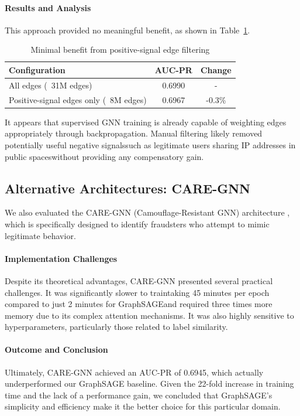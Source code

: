 \paragraph{Results and Analysis}
This approach provided no meaningful benefit, as shown in Table~\ref{tab:edge_filtering_results}.

\begin{table}[h]
\centering
\caption{Minimal benefit from positive-signal edge filtering}
\label{tab:edge_filtering_results}
\begin{tabular}{lcc}
\hline
\textbf{Configuration} & \textbf{AUC-PR} & \textbf{Change} \\
\hline
All edges (~31M edges) & 0.6990 & - \\
Positive-signal edges only (~8M edges) & 0.6967 & -0.3\% \\
\hline
\end{tabular}
\end{table}

It appears that supervised GNN training is already capable of weighting edges appropriately through backpropagation. Manual filtering likely removed potentially useful negative signalssuch as legitimate users sharing IP addresses in public spaceswithout providing any compensatory gain.

\subsection{Alternative Architectures: CARE-GNN}

We also evaluated the CARE-GNN (Camouflage-Resistant GNN) architecture \cite{dou2020enhancing}, which is specifically designed to identify fraudsters who attempt to mimic legitimate behavior.

\paragraph{Implementation Challenges}
Despite its theoretical advantages, CARE-GNN presented several practical challenges. It was significantly slower to traintaking 45 minutes per epoch compared to just 2 minutes for GraphSAGEand required three times more memory due to its complex attention mechanisms. It was also highly sensitive to hyperparameters, particularly those related to label similarity.

\paragraph{Outcome and Conclusion}
Ultimately, CARE-GNN achieved an AUC-PR of 0.6945, which actually underperformed our GraphSAGE baseline. Given the 22-fold increase in training time and the lack of a performance gain, we concluded that GraphSAGE's simplicity and efficiency make it the better choice for this particular domain.

